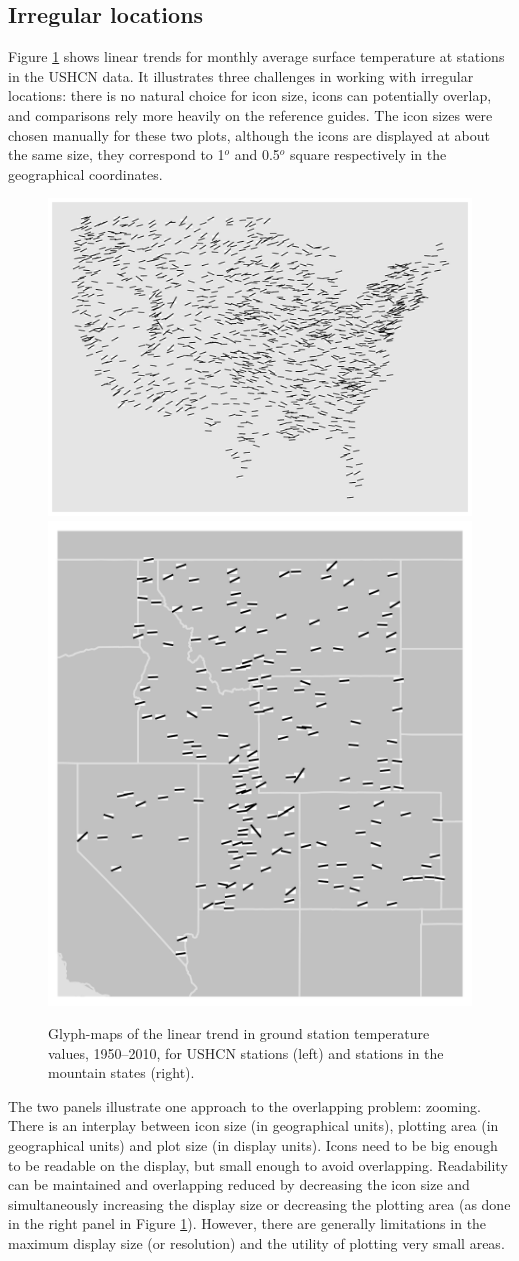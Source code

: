 \documentclass[oneside]{article}
\begin{document}
\subsection{Irregular locations}
Figure \ref{fig:irregular} shows linear trends for monthly average surface temperature at stations in the USHCN data.  It illustrates three challenges in working with irregular locations: there is no natural choice for icon size, icons can potentially overlap, and comparisons rely more heavily on the reference guides.  The icon sizes were chosen manually for these two plots, although the icons are displayed at about the same size, they correspond to 1$^o$ and 0.5$^o$ square respectively in the geographical coordinates. 
\begin{figure}[htbp]
  \centering
  \includegraphics[width=0.55\linewidth]{usa-lin-overlap}%
  \includegraphics[width=0.35\linewidth]{ghcn-mountains}%
  \caption{Glyph-maps of the linear trend in ground station temperature values, 1950--2010, for USHCN stations (left) and stations in the mountain states (right).} 
  \label{fig:irregular}
\end{figure}
The two panels illustrate one approach to the overlapping problem: zooming.  There is an interplay between icon size (in geographical units), plotting area (in geographical units) and plot size (in display units).  Icons need to be big enough to be readable on the display, but small enough to avoid overlapping.  Readability can be maintained and overlapping reduced by decreasing the icon size and simultaneously increasing the display size or decreasing the plotting area (as done in the right panel in Figure \ref{fig:irregular}).  However, there are generally limitations in the maximum display size (or resolution) and the utility of plotting very small areas.  
\end{document}
